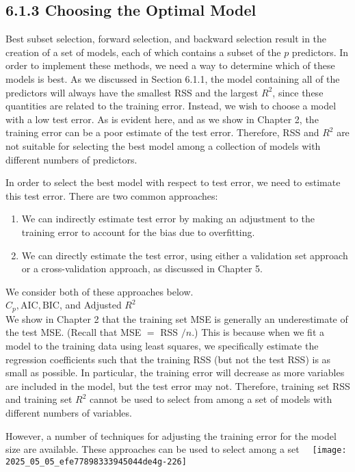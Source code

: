 \documentclass[10pt]{article}
\begin{document}
\subsection*{6.1.3 Choosing the Optimal Model}
Best subset selection, forward selection, and backward selection result in the creation of a set of models, each of which contains a subset of the $p$ predictors. In order to implement these methods, we need a way to determine which of these models is best. As we discussed in Section 6.1.1, the model containing all of the predictors will always have the smallest RSS and the largest $R^{2}$, since these quantities are related to the training error. Instead, we wish to choose a model with a low test error. As is evident here, and as we show in Chapter 2, the training error can be a poor estimate of the test error. Therefore, RSS and $R^{2}$ are not suitable for selecting the best model among a collection of models with different numbers of predictors.

In order to select the best model with respect to test error, we need to estimate this test error. There are two common approaches:

\begin{enumerate}
  \item We can indirectly estimate test error by making an adjustment to the training error to account for the bias due to overfitting.
  \item We can directly estimate the test error, using either a validation set approach or a cross-validation approach, as discussed in Chapter 5.
\end{enumerate}

We consider both of these approaches below.\\
$C_{p}, \mathrm{AIC}, \mathrm{BIC}$, and Adjusted $R^{2}$\\
We show in Chapter 2 that the training set MSE is generally an underestimate of the test MSE. (Recall that MSE $=$ RSS $/ n$.) This is because when we fit a model to the training data using least squares, we specifically estimate the regression coefficients such that the training RSS (but not the test RSS) is as small as possible. In particular, the training error will decrease as more variables are included in the model, but the test error may not. Therefore, training set RSS and training set $R^{2}$ cannot be used to select from among a set of models with different numbers of variables.

However, a number of techniques for adjusting the training error for the model size are available. These approaches can be used to select among a set\
\
\texttt{[image: 2025\_05\_05\_efe77898333945044de4g-226]}
\end{document}
